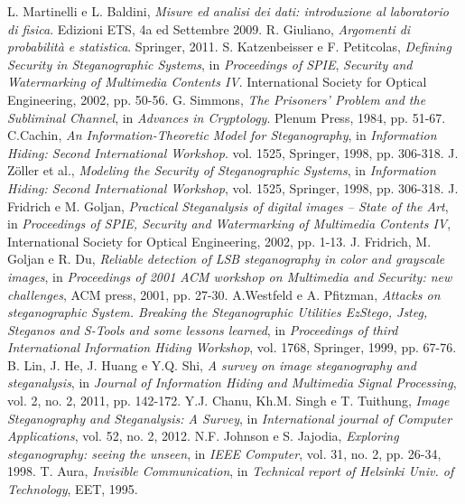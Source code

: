\begin{thebibliography}{}
L. Martinelli e L. Baldini,
\textit{Misure ed analisi dei dati: introduzione al laboratorio di fisica}. 
Edizioni ETS, 4a ed Settembre 2009.
R. Giuliano, \textit{Argomenti di probabilità e statistica}. Springer, 2011.
S. Katzenbeisser e F. Petitcolas, \textit{Defining Security in Steganographic Systems}, in \textit{Proceedings of SPIE}, \textit{Security and Watermarking of Multimedia Contents IV}. International Society for Optical Engineering, 2002, pp. 50-56.
G. Simmons, \textit{The Prisoners' Problem and the Subliminal Channel}, in \textit{Advances in Cryptology}. Plenum Press, 1984, pp. 51-67.
C.Cachin, \textit{An Information-Theoretic Model for Steganography}, in \textit{Information Hiding: Second International Workshop}. vol. 1525, Springer, 1998, pp. 306-318.
J. Z\"oller et al., \textit{Modeling the Security of Steganographic Systems}, in \textit{Information Hiding: Second International Workshop}, vol. 1525, Springer, 1998, pp. 306-318.
J. Fridrich e M. Goljan, \textit{Practical Steganalysis of digital images – State of the Art}, in \textit{Proceedings of SPIE, Security and Watermarking of Multimedia Contents IV}, International Society for Optical Engineering, 2002, pp. 1-13.
J. Fridrich, M. Goljan e R. Du, \textit{Reliable detection of LSB steganography in color and grayscale images}, in \textit{Proceedings of 2001 ACM workshop on Multimedia and Security: new challenges}, ACM press, 2001, pp. 27-30.
\newpage
{}
A.Westfeld e A. Pfitzman, \textit{Attacks on steganographic System. Breaking the Steganographic Utilities EzStego, Jsteg, Steganos and S-Tools and some lessons learned}, in \textit{Proceedings of third International Information Hiding Workshop}, vol. 1768, Springer, 1999, pp. 67-76.
B. Lin, J. He, J. Huang e Y.Q. Shi, \textit{A survey on image steganography and steganalysis}, in \textit{Journal of Information
Hiding and Multimedia Signal Processing}, vol. 2, no. 2, 2011, pp. 142-172.
Y.J. Chanu, Kh.M. Singh e T. Tuithung, \textit{Image Steganography and Steganalysis: A Survey}, in \textit{International journal of Computer Applications}, vol. 52, no. 2, 2012.
N.F. Johnson e S. Jajodia, \textit{Exploring steganography: seeing the unseen}, in \textit{IEEE Computer}, vol. 31, no. 2, pp. 26-34, 1998.
T. Aura, \textit{Invisible Communication}, in \textit{Technical report of Helsinki Univ. of Technology}, EET, 1995.

\end{thebibliography}
